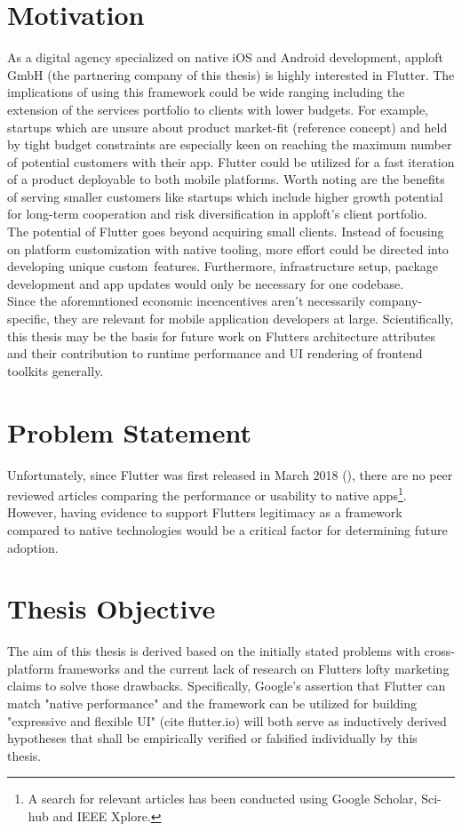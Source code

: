 \section{Motivation}
\label{section:motivation}
As a digital agency specialized on native iOS and Android development, apploft GmbH 
(the partnering company of this thesis) is highly interested in Flutter. 
The implications of using this framework could be wide ranging including the extension of the services portfolio
to clients with lower budgets.
For example, startups which are unsure about product market-fit (reference concept) and held by tight budget constraints are especially keen on reaching 
the maximum number of potential customers with their app. Flutter could be utilized for a fast iteration of a product deployable to 
both mobile platforms. 
Worth noting are the benefits of serving smaller customers like startups which include higher growth potential for long-term cooperation
and risk diversification in apploft's client portfolio.\\
The potential of Flutter goes beyond acquiring small clients. Instead of focusing on platform customization with native tooling, more effort could 
be directed into developing unique custom features.
Furthermore, infrastructure setup, package development and app updates would only be necessary for one codebase.\\
Since the aforemntioned economic incencentives aren't necessarily company-specific, they are relevant for mobile application developers at large.
Scientifically, this thesis may be the basis for future work on Flutters architecture attributes and their contribution to runtime performance and UI rendering of frontend toolkits generally.

\section{Problem Statement}
Unfortunately, since Flutter was first released in March 2018 (\cite{FlutterReleases2020}), 
there are no peer reviewed articles comparing the performance or usability to native apps\footnote{A search for relevant articles has been conducted using Google Scholar, Sci-hub and IEEE Xplore.}. 
However, having evidence to support Flutters legitimacy as a framework compared to native technologies would be a critical factor for determining future adoption.

\section{Thesis Objective}
The aim of this thesis is derived based on the initially stated problems with cross-platform frameworks and the current lack of research on Flutters lofty marketing claims to solve those drawbacks.
Specifically, Google's assertion that Flutter can match "native performance" and the framework can be utilized for building "expressive and flexible UI" (cite flutter.io)
will both serve as inductively derived hypotheses that shall be empirically verified or falsified individually by this thesis.

